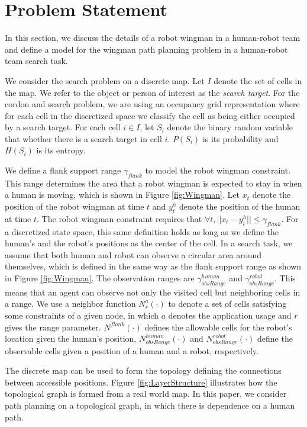 \section{Problem Statement}
\label{sec:problem_statement}

In this section, we discuss the details of a robot wingman in a human-robot team and define a model for the wingman path planning problem in a human-robot team search task.

We consider the search problem on a discrete map.
Let $ I $ denote the set of cells in the map.
We refer to the object or person of interest as the \emph{search target}.
For the cordon and search problem, we are using an occupancy grid representation where for each cell in the discretized space we classify the cell as being either occupied by a search target.
For each cell $ i \in I $, let $ S_{i} $ denote the binary random variable that whether there is a search target in cell $ i $.
$ P(S_{i}) $ is its probability and $ H(S_{i}) $ is its entropy.

We define a flank support range $ \gamma_{flank} $ to model the robot wingman constraint. 
This range determines the area that a robot wingman is expected to stay in when a human is moving, which is shown in Figure \ref{fig:Wingman}.
Let $ x_{t} $ denote the position of the robot wingman at time $ t $ and $ y^{h}_{t} $ denote the position of the human at time $ t $.
The robot wingman constraint requires that $ \forall t, || x_{t} - y^{h}_{t} || \leq \gamma_{flank} $.
For a discretized state space, this same definition holds as long as we define the human's and the robot's positions as the center of the cell.
In a search task, we assume that both human and robot can observe a circular area around themselves, which is defined in the same way as the flank support range as shown in Figure \ref{fig:Wingman}.
The observation ranges are $ \gamma^{human}_{obsRange} $ and $ \gamma^{robot}_{obsRange} $.
This means that an agent can observe not only the visited cell but neighboring cells in a range.
We use a neighbor function $ N^{a}_{r}(\cdot) $ to denote a set of cells satisfying some constraints of a given node, in which $ a $ denotes the application usage and $ r $ gives the range parameter.
$ N^{flank}(\cdot) $ defines the allowable cells for the robot's location given the human's position, $ N^{human}_{obsRange}(\cdot) $ and $ N^{robot}_{obsRange}(\cdot) $ define the observable cells given a position of a human and a robot, respectively.

The discrete map can be used to form the topology defining the connections between accessible positions.
Figure \ref{fig:LayerStructure} illustrates how the topological graph is formed from a real world map.
In this paper, we consider path planning on a topological graph, in which there is dependence on a human path.

